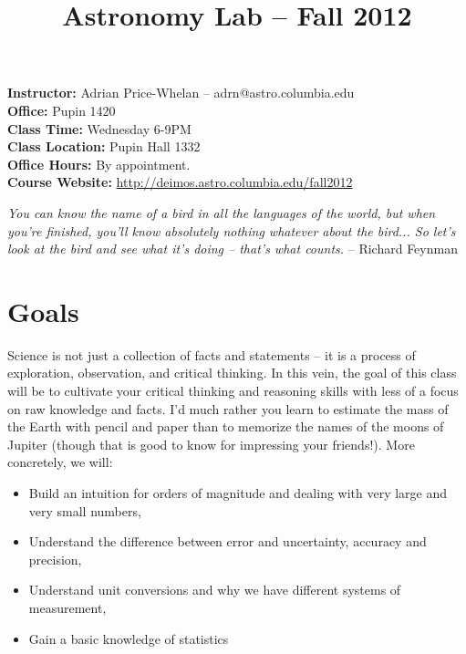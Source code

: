 \documentclass[12pt]{article}
\begin{document}
\title{\Huge Astronomy Lab -- Fall 2012}
\author{}
\date{}%

\maketitle

\thispagestyle{empty}

\vspace{-0.5in}
\large
\noindent\textbf{Instructor:} \hspace{0.1in} Adrian Price-Whelan  -- adrn@astro.columbia.edu\\
\textbf{Office:} \hspace{0.1in} Pupin 1420\\
\textbf{Class Time:} \hspace{0.1in} Wednesday 6-9PM\\
\textbf{Class Location:} \hspace{0.1in} Pupin Hall 1332\\
\textbf{Office Hours:} \hspace{0.1in} By appointment.\\

\noindent\textbf{Course Website:} \url{http://deimos.astro.columbia.edu/fall2012}\newline

\noindent\emph{You can know the name of a bird in all the languages of the world, but when you're finished, you'll know absolutely nothing whatever about the bird... So let's look at the bird and see what it's doing -- that's what counts.} -- Richard Feynman

\normalsize

\section*{Goals}
Science is not just a collection of facts and statements -- it is a process of exploration, observation, and critical thinking. In this vein, the goal of this class will be to cultivate your critical thinking and reasoning skills with less of a focus on raw knowledge and facts. I'd much rather you learn to estimate the mass of the Earth with pencil and paper than to memorize the names of the moons of Jupiter (though that is good to know for impressing your friends!). More concretely, we will:
\begin{itemize}
	\item Build an intuition for orders of magnitude and dealing with very large and very small numbers,
	\item Understand the difference between error and uncertainty, accuracy and precision,
	\item Understand unit conversions and why we have different systems of measurement,
	\item Gain a basic knowledge of statistics
\end{itemize}
\end{document}
